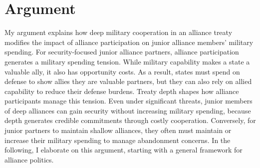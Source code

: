 \documentclass[12pt]{article}
\begin{document}
\section{Argument}

My argument explains how deep military cooperation in an alliance treaty modifies the impact of alliance participation on junior alliance members' military spending.
For security-focused junior alliance partners, alliance participation generates a military spending tension. 
While military capability makes a state a valuable ally, it also has opportunity costs. 
As a result, states must spend on defense to show allies they are valuable partners, but they can also rely on allied capability to reduce their defense burdens. 
Treaty depth shapes how alliance participants manage this tension. 
Even under significant threats, junior members of deep alliances can gain security without increasing military spending, because depth generates credible commitments through costly cooperation. 
Conversely, for junior partners to maintain shallow alliances, they often must maintain or increase their military spending to manage abandonment concerns. 
In the following, I elaborate on this argument, starting with a general framework for alliance politics. 





\end{document}
